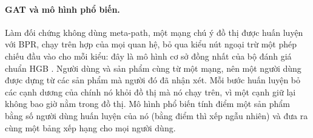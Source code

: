 \paragraph{GAT và mô hình phổ biến.} Làm đối chứng không dùng meta-path, một mạng chú ý đồ thị
\citep{velickovic2018graph} được huấn luyện với BPR, chạy trên hợp của mọi quan hệ, bỏ qua kiểu nút
ngoại trừ một phép chiếu đầu vào cho mỗi kiểu: đây là mô hình cơ sở đồng nhất của bộ đánh giá chuẩn
HGB \citep{lv2021hgb}. Người dùng và sản phẩm cùng từ một mạng, nên một người dùng được dựng từ
các sản phẩm mà người đó đã nhận xét. Mỗi bước huấn luyện bỏ các cạnh dương của chính nó khỏi đồ
thị mà nó chạy trên, vì một cạnh giữ lại không bao giờ nằm trong đồ thị. Mô hình phổ biến tính
điểm một sản phẩm bằng số người dùng huấn luyện của nó (bằng điểm thì xếp ngẫu nhiên) và đưa ra
cùng một bảng xếp hạng cho mọi người dùng.
